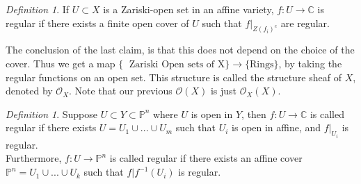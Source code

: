 \documentclass[12pt]{article}
\theoremstyle{remark}
\newtheorem{definition}[theorem]{Definition}
\newcommand{\C}{\mathbb{C}}
\newcommand{\Pp}{\mathbb{P}}
\begin{document}
\begin{definition}
If $U \subset X$ is a Zariski-open set in an affine variety, $f: U \rightarrow \C$ is regular if there exists a finite open cover of $U$ such that $f|_{Z(f_i)^c}$ are regular.
\end{definition}

The conclusion of the last claim, is that this does not depend on the choice of the cover. Thus we get a map $\{ \; \text{ Zariski Open sets of X} \} \rightarrow \{ \text{Rings} \}$, by taking the regular functions on an open set. This structure is called the structure sheaf of $X$, denoted by $\mathcal{O}_X$. Note that our previous $\mathcal{O}(X)$ is just $\mathcal{O}_X(X)$.


\begin{definition}
Suppose $U \subset Y \subset \Pp^n$ where $U$ is open in $Y$, then $f: U \rightarrow \C$ is called regular if there exists $U = U_1 \cup ... \cup U_m$ such that $U_i$ is open in affine, and $f|_{U_i}$ is regular.\\

Furthermore, $f: U \rightarrow \Pp^n$ is called regular if there exists an affine cover $\Pp^n = U_1 \cup ... \cup U_k$ such that $f|{f^{-1}(U_i)}$ is regular.
\end{definition} 


\begin{thebibliography}{9}












\end{thebibliography}
\end{document}

